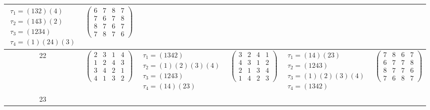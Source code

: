 \begin{longtable}{|c|p{2.7cm}|p{2.7cm}|p{2.7cm}|p{2.7cm}|p{2.7cm}|}
    $\begin{array}{l}\tau_{1}=(132)(4)\\ \tau_{2}=(143)(2)\\ \tau_{3}=(1234)\\ \tau_{4}=(1)(24)(3)\end{array}$     &
    $\begin{pmatrix} 6 & 7 & 8 & 7 \\ 7 & 6 & 7 & 8 \\ 8 & 7 & 6 & 7 \\ 7 & 8 & 7 & 6 \end{pmatrix}$                                                                                           \\
    \hline
    22                                                                                                             &
    $\begin{pmatrix} 2 & 3 & 1 & 4 \\ 1 & 2 & 4 & 3 \\ 3 & 4 & 2 & 1 \\ 4 & 1 & 3 & 2 \end{pmatrix}$               &
    $\begin{array}{l}\tau_{1}=(1342)\\ \tau_{2}=(1)(2)(3)(4)\\ \tau_{3}=(1243)\\ \tau_{4}=(14)(23)\end{array}$     &
    $\begin{pmatrix} 3 & 2 & 4 & 1 \\ 4 & 3 & 1 & 2 \\ 2 & 1 & 3 & 4 \\ 1 & 4 & 2 & 3 \end{pmatrix}$               &
    $\begin{array}{l}\tau_{1}=(14)(23)\\ \tau_{2}=(1243)\\ \tau_{3}=(1)(2)(3)(4)\\ \tau_{4}=(1342)\end{array}$     &
    $\begin{pmatrix} 7 & 8 & 6 & 7 \\ 6 & 7 & 7 & 8 \\ 8 & 7 & 7 & 6 \\ 7 & 6 & 8 & 7 \end{pmatrix}$                                                                                           \\
    \hline
    23                                                                                                             &

\end{longtable}
